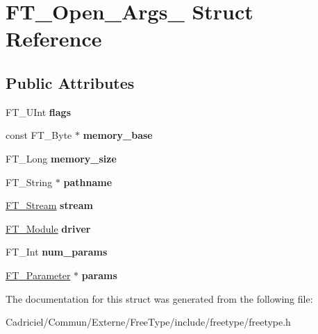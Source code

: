 \hypertarget{struct_f_t___open___args__}{}\section{F\+T\+\_\+\+Open\+\_\+\+Args\+\_\+ Struct Reference}
\label{struct_f_t___open___args__}
\subsection*{Public Attributes}
\begin{DoxyCompactItemize}
\item 
F\+T\+\_\+\+U\+Int {\bfseries flags}\hypertarget{struct_f_t___open___args___a2e3e6b9284fe8b4d9833e247a19181fa}{}\label{struct_f_t___open___args___a2e3e6b9284fe8b4d9833e247a19181fa}

\item 
const F\+T\+\_\+\+Byte $\ast$ {\bfseries memory\+\_\+base}\hypertarget{struct_f_t___open___args___a1231da51bc58922096b3bc603bb2ffb0}{}\label{struct_f_t___open___args___a1231da51bc58922096b3bc603bb2ffb0}

\item 
F\+T\+\_\+\+Long {\bfseries memory\+\_\+size}\hypertarget{struct_f_t___open___args___a87f0bb2f257abe94c93a79e0de3525da}{}\label{struct_f_t___open___args___a87f0bb2f257abe94c93a79e0de3525da}

\item 
F\+T\+\_\+\+String $\ast$ {\bfseries pathname}\hypertarget{struct_f_t___open___args___aea3d454d9fd9bb7434aad07e651d027b}{}\label{struct_f_t___open___args___aea3d454d9fd9bb7434aad07e651d027b}

\item 
\hyperlink{struct_f_t___stream_rec__}{F\+T\+\_\+\+Stream} {\bfseries stream}\hypertarget{struct_f_t___open___args___ae1e6444bf0c21b323ce6cbe8bc475b2b}{}\label{struct_f_t___open___args___ae1e6444bf0c21b323ce6cbe8bc475b2b}

\item 
\hyperlink{struct_f_t___module_rec__}{F\+T\+\_\+\+Module} {\bfseries driver}\hypertarget{struct_f_t___open___args___a7c01bd7e34a440c3e89141ee521e2646}{}\label{struct_f_t___open___args___a7c01bd7e34a440c3e89141ee521e2646}

\item 
F\+T\+\_\+\+Int {\bfseries num\+\_\+params}\hypertarget{struct_f_t___open___args___afaf47d9e1631f2147b696fd7f5a6f4eb}{}\label{struct_f_t___open___args___afaf47d9e1631f2147b696fd7f5a6f4eb}

\item 
\hyperlink{struct_f_t___parameter__}{F\+T\+\_\+\+Parameter} $\ast$ {\bfseries params}\hypertarget{struct_f_t___open___args___a77b279a34beba29bc14901926f79818f}{}\label{struct_f_t___open___args___a77b279a34beba29bc14901926f79818f}

\end{DoxyCompactItemize}


The documentation for this struct was generated from the following file\+:\begin{DoxyCompactItemize}
\item 
Cadriciel/\+Commun/\+Externe/\+Free\+Type/include/freetype/freetype.\+h\end{DoxyCompactItemize}
